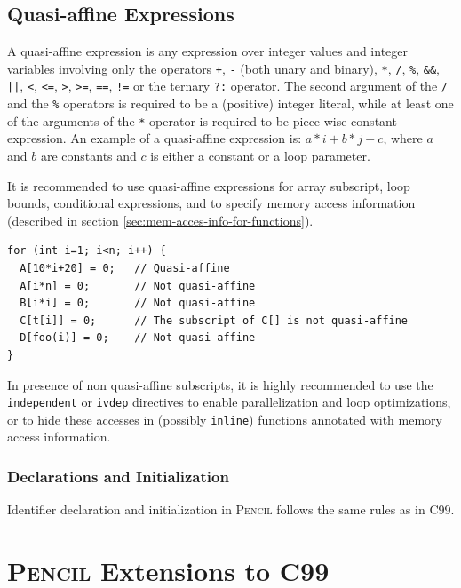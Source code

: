 \documentclass{carp}
\newcommand\pencil{\textsc{Pencil}\xspace}
\newcommand{\C}{C99\xspace}
\begin{document}
\subsection{Quasi-affine Expressions}
\label{sec:quasi-affine}

A quasi-affine expression is any expression over integer values and
integer variables involving only the operators \lstinline{+},
\lstinline{-} (both unary and binary), \lstinline{*}, \lstinline{/},
\lstinline{%}, \lstinline{&&}, \lstinline{||}, \lstinline{<}, \lstinline{<=},
\lstinline{>}, \lstinline{>=}, \lstinline{==}, \lstinline{!=} or the
ternary \lstinline{?:} operator.  The second argument of the
\lstinline{/} and the \lstinline{%}
operators is required to be a (positive) integer literal, while at
least one of the arguments of the \lstinline{*} operator is
required to be piece-wise constant expression. An example of a
quasi-affine expression is: $a*i+b*j+c$, where $a$ and $b$ are
constants and $c$ is either a constant or a loop parameter.

It is recommended to use quasi-affine expressions for
array subscript, loop bounds, conditional expressions,
and to specify memory access information (described in
section \ref{sec:mem-acces-info-for-functions}).

\begin{lstlisting}[language=pencil]
for (int i=1; i<n; i++) {
  A[10*i+20] = 0;	// Quasi-affine
  A[i*n] = 0;		// Not quasi-affine
  B[i*i] = 0;		// Not quasi-affine
  C[t[i]] = 0;		// The subscript of C[] is not quasi-affine
  D[foo(i)] = 0;	// Not quasi-affine
}
\end{lstlisting}

In presence of non quasi-affine subscripts, it is highly recommended
to use the \lstinline!independent! or \lstinline!ivdep! directives to
enable parallelization and loop optimizations, or to hide these
accesses in (possibly \lstinline!inline!) functions annotated with
memory access information.

\subsubsection{Declarations and Initialization}
Identifier declaration and initialization in \pencil follows the same
rules as in \C.

\section{\pencil Extensions to C99}
\label{pencil-extension-short}
\end{document}
